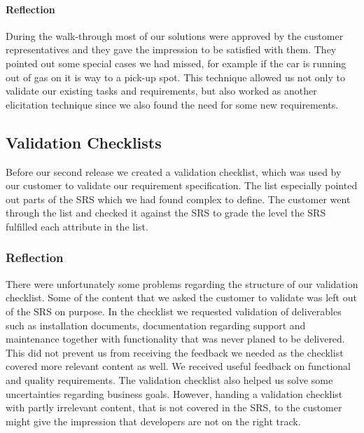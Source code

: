 \documentclass[10pt]{article}
\begin{document}
\paragraph{Reflection}
\hfill \break
During the walk-through most of our solutions were approved by the customer representatives and they gave the impression to be satisfied with them.
They pointed out some special cases we had missed, for example if the car is running out of gas on it is way to a pick-up spot.
This technique allowed us not only to validate our existing tasks and requirements, but also worked as another elicitation technique since we also found the need for some new requirements.

\subsection{Validation Checklists}
Before our second release we created a validation checklist, which was used by our customer to validate our requirement specification. The list especially pointed out parts of the SRS which we had found complex to define. The customer went through the list and checked it against the SRS to grade the level the SRS fulfilled each attribute in the list.

\subsubsection{Reflection}
There were unfortunately some problems regarding the structure of our validation checklist. Some of the content that we asked the customer to validate was left out of the SRS on purpose. In the checklist we requested validation of deliverables such as installation documents, documentation regarding support and maintenance together with functionality that was never planed to be delivered.
This did not prevent us from receiving the feedback we needed as the checklist covered more relevant content as well. We received useful feedback on functional and quality requirements. The validation checklist also helped us solve some uncertainties regarding business goals. However, handing a validation checklist with partly irrelevant content, that is not covered in the SRS, to the customer might give the impression that developers are not on the right track.
\end{document}
